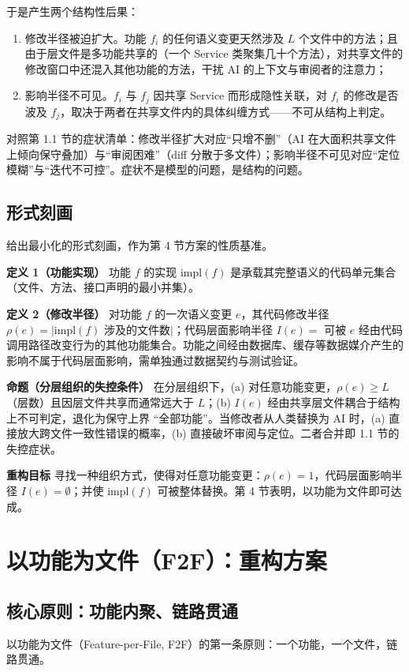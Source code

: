 \documentclass[11pt,a4paper]{ctexart}
\begin{document}
于是产生两个结构性后果：

\begin{enumerate}
\item 修改半径被迫扩大。功能 $f_i$ 的任何语义变更天然涉及 $L$ 个文件中的方法；且由于层文件是多功能共享的（一个 Service 类聚集几十个方法），对共享文件的修改窗口中还混入其他功能的方法，干扰 AI 的上下文与审阅者的注意力；
\item 影响半径不可见。$f_i$ 与 $f_j$ 因共享 Service 而形成隐性关联，对 $f_i$ 的修改是否波及 $f_j$，取决于两者在共享文件内的具体纠缠方式——不可从结构上判定。
\end{enumerate}

对照第 1.1 节的症状清单：修改半径扩大对应“只增不删”（AI 在大面积共享文件上倾向保守叠加）与“审阅困难”（diff 分散于多文件）；影响半径不可见对应“定位模糊”与“迭代不可控”。症状不是模型的问题，是结构的问题。

\subsection{形式刻画}
给出最小化的形式刻画，作为第 4 节方案的性质基准。

\textbf{定义 1（功能实现）} 功能 $f$ 的实现 $\mathrm{impl}(f)$ 是承载其完整语义的代码单元集合（文件、方法、接口声明的最小并集）。

\textbf{定义 2（修改半径）} 对功能 $f$ 的一次语义变更 $e$，其代码修改半径 $\rho(e)=|\mathrm{impl}(f)$ 涉及的文件数$|$；代码层面影响半径 $I(e)=$ 可被 $e$ 经由代码调用路径改变行为的其他功能集合。功能之间经由数据库、缓存等数据媒介产生的影响不属于代码层面影响，需单独通过数据契约与测试验证。

\textbf{命题（分层组织的失控条件）} 在分层组织下，(a) 对任意功能变更，$\rho(e)\ge L$（层数）且因层文件共享而通常远大于 $L$；(b) $I(e)$ 经由共享层文件耦合于结构上不可判定，退化为保守上界 “全部功能”。当修改者从人类替换为 AI 时，(a) 直接放大跨文件一致性错误的概率，(b) 直接破坏审阅与定位。二者合并即 1.1 节的失控症状。

\textbf{重构目标} 寻找一种组织方式，使得对任意功能变更：$\rho(e)=1$，代码层面影响半径 $I(e)=\emptyset$；并使 $\mathrm{impl}(f)$ 可被整体替换。第 4 节表明，以功能为文件即可达成。

\section{以功能为文件（F2F）：重构方案}
\subsection{核心原则：功能内聚、链路贯通}
以功能为文件（Feature-per-File, F2F）的第一条原则：一个功能，一个文件，链路贯通。
\end{document}
